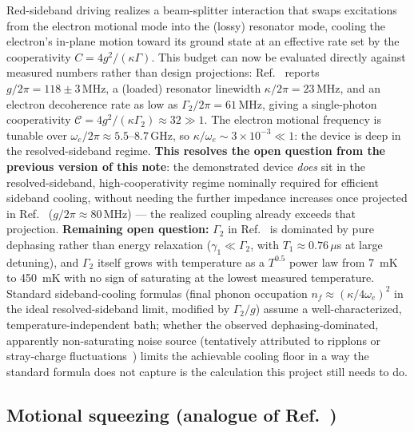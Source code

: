\documentclass[aps,prapplied,reprint,superscriptaddress,longbibliography]{revtex4-2}
\begin{document}
Red-sideband driving realizes a beam-splitter interaction that swaps excitations from the electron
motional mode into the (lossy) resonator mode, cooling the electron's in-plane motion toward its
ground state at an effective rate set by the cooperativity $C = 4g^2/(\kappa\Gamma)$. This budget can
now be evaluated directly against measured numbers rather than design projections:
Ref.~\cite{koolstra2026strong} reports $g/2\pi = 118\pm3\,\mathrm{MHz}$, a (loaded) resonator
linewidth $\kappa/2\pi = 23\,\mathrm{MHz}$, and an electron decoherence rate as low as
$\Gamma_2/2\pi = 61\,\mathrm{MHz}$, giving a single-photon cooperativity
$\mathcal{C} = 4g^2/(\kappa\Gamma_2) \approx 32 \gg 1$. The electron motional frequency is tunable
over $\omega_e/2\pi \approx 5.5$--$8.7\,\mathrm{GHz}$, so $\kappa/\omega_e \sim 3\times10^{-3} \ll 1$:
the device is deep in the resolved-sideband regime. \textbf{This resolves the open question from the
previous version of this note}: the demonstrated device \emph{does} sit in the resolved-sideband,
high-cooperativity regime nominally required for efficient sideband cooling, without needing the
further impedance increases once projected in Ref.~\cite{koolstra2025impedance}
($g/2\pi\approx80\,\mathrm{MHz}$) — the realized coupling already exceeds that projection.
\textbf{Remaining open question:} $\Gamma_2$ in Ref.~\cite{koolstra2026strong} is dominated by pure
dephasing rather than energy relaxation ($\gamma_1 \ll \Gamma_2$, with $T_1 \approx 0.76\,\mu$s at
large detuning), and $\Gamma_2$ itself grows with temperature as a $T^{0.5}$ power law from 7~mK to
450~mK with no sign of saturating at the lowest measured temperature. Standard sideband-cooling
formulas (final phonon occupation $n_f \approx (\kappa/4\omega_e)^2$ in the ideal resolved-sideband
limit, modified by $\Gamma_2/g$) assume a well-characterized, temperature-independent bath; whether
the observed dephasing-dominated, apparently non-saturating noise source (tentatively attributed to
ripplons or stray-charge fluctuations~\cite{koolstra2026strong}) limits the achievable cooling floor
in a way the standard formula does not capture is the calculation this project still needs to do.

\subsection{Motional squeezing (analogue of Ref.~\cite{pirkkalainen2015squeezing})}
\label{sec:squeezing}
\end{document}
